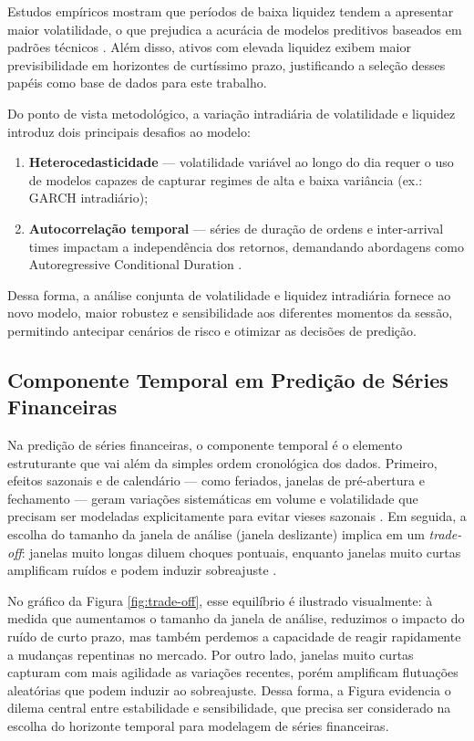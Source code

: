 Estudos empíricos mostram que períodos de baixa liquidez tendem a apresentar maior volatilidade, o que prejudica a acurácia de modelos preditivos baseados em padrões técnicos \cite{dufour2000time}. Além disso, ativos com elevada liquidez exibem maior previsibilidade em horizontes de curtíssimo prazo, justificando a seleção desses papéis como base de dados para este trabalho.

Do ponto de vista metodológico, a variação intradiária de volatilidade e liquidez introduz dois principais desafios ao modelo:  
\begin{enumerate}
  \item \textbf{Heterocedasticidade} — volatilidade variável ao longo do dia requer o uso de modelos capazes de capturar regimes de alta e baixa variância (ex.: GARCH intradiário);  
  \item \textbf{Autocorrelação temporal} — séries de duração de ordens e inter‐arrival times impactam a independência dos retornos, demandando abordagens como Autoregressive Conditional Duration \cite{engle1998acd}.  
\end{enumerate}

Dessa forma, a análise conjunta de volatilidade e liquidez intradiária fornece ao novo modelo, maior robustez e sensibilidade aos diferentes momentos da sessão, permitindo antecipar cenários de risco e otimizar as decisões de predição.


\subsection{Componente Temporal em Predição de Séries Financeiras}

Na predição de séries financeiras, o componente temporal é o elemento estruturante que vai além da simples ordem cronológica dos dados. Primeiro, efeitos sazonais e de calendário — como feriados, janelas de pré-abertura e fechamento — geram variações sistemáticas em volume e volatilidade que precisam ser modeladas explicitamente para evitar vieses sazonais \cite{hyndman_2018}. Em seguida, a escolha do tamanho da janela de análise (janela deslizante) implica em um \textit{trade-off}: janelas muito longas diluem choques pontuais, enquanto janelas muito curtas amplificam ruídos e podem induzir sobreajuste \cite{hyndman_2018}.  

No gráfico da Figura \ref{fig:trade-off}, esse equilíbrio é ilustrado visualmente: à medida que aumentamos o tamanho da janela de análise, reduzimos o impacto do ruído de curto prazo, mas também perdemos a capacidade de reagir rapidamente a mudanças repentinas no mercado. Por outro lado, janelas muito curtas capturam com mais agilidade as variações recentes, porém amplificam flutuações aleatórias que podem induzir ao sobreajuste. Dessa forma, a Figura evidencia o dilema central entre estabilidade e sensibilidade, que precisa ser considerado na escolha do horizonte temporal para modelagem de séries financeiras.

